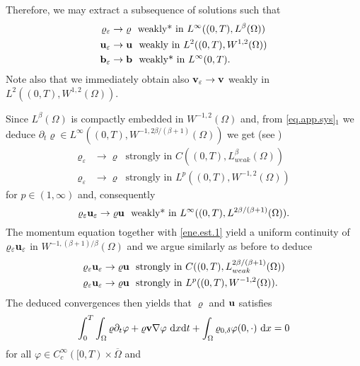 \documentclass{article}
\newcommand{\bb}{{\bf b}}
\newcommand{\vb}{\bb}
\newcommand{\bu}{{\bf u}}
\newcommand{\vu}{\bu}
\newcommand{\bv}{{\bf v}}
\newcommand{\vv}{\bv}
\newcommand{\pat}{\partial_t}
\numberwithin{equation}{section}
\begin{document}
Therefore, we may extract a subsequence of solutions such that
\begin{equation*}
\begin{split}
\varrho_\varepsilon & \to \varrho \ \mbox{ weakly* in }L^\infty((0,T),L^{\beta}(\Omega))\\
\vu_\varepsilon &\to \vu \ \mbox{ weakly in }L^2((0,T),W^{1,2}(\Omega))\\
\vb_\varepsilon &\to \vb \ \mbox{ weakly* in }L^\infty(0,T).
\end{split}
\end{equation*}
Note also that we immediately obtain also $\vv_\varepsilon\to \vv$ weakly in $L^2((0,T),W^{1,2}(\Omega))$.

Since $L^\beta(\Omega)$ is compactly embedded in $W^{-1,2}(\Omega)$ and, from \eqref{eq.app.sys}$_1$ we deduce $\pat\varrho\in L^\infty((0,T), W^{-1,2\beta/(\beta+1)}(\Omega))$ we get (see \cite[Lemma 6.2]{NoSt})
\begin{equation}\label{eq.rho.str}
\begin{split}
\varrho_\varepsilon &\to \varrho\ \mbox{ strongly in }C((0,T),L^\beta_{weak}(\Omega))\\
\varrho_\varepsilon &\to \varrho\ \mbox{ strongly in }L^p((0,T),W^{-1,2}(\Omega))
\end{split}
\end{equation}
for $p\in (1,\infty)$ and, consequently
$$
\varrho_\varepsilon \vu_\varepsilon \to \varrho\vu \ \mbox{ weakly* in }L^\infty((0,T), L^{2\beta/(\beta+1)}(\Omega)).
$$
The momentum equation together with \eqref{ene.est.1} yield a uniform continuity of $\varrho_\varepsilon\vu_\varepsilon$ in $W^{-1,(\beta+1)/\beta}(\Omega)$ and we argue similarly as before to deduce
\begin{equation}\label{eq.mom.str}
\begin{split}
\varrho_\varepsilon \vu_\varepsilon &\to \varrho\vu\ \mbox{ strongly in }C((0,T),L^{2\beta/(\beta+1)}_{weak}(\Omega))\\
\varrho_\varepsilon \vu_\varepsilon &\to \varrho\vu\ \mbox{ strongly in }L^p((0,T),W^{-1,2}(\Omega)).
\end{split}
\end{equation}
The deduced convergences then yields that $\varrho$ and $\vu$ satisfies
\begin{equation*}
\int_0^T\int_\Omega \varrho \pat \varphi + \varrho\vv \nabla\varphi\ {\rm d}x{\rm d}t + \int_\Omega \varrho_{0,\delta} \varphi(0,\cdot)\ {\rm d}x = 0
\end{equation*}
for all $\varphi \in C^\infty_c([0,T)\times \overline\Omega$ and
\end{document}
